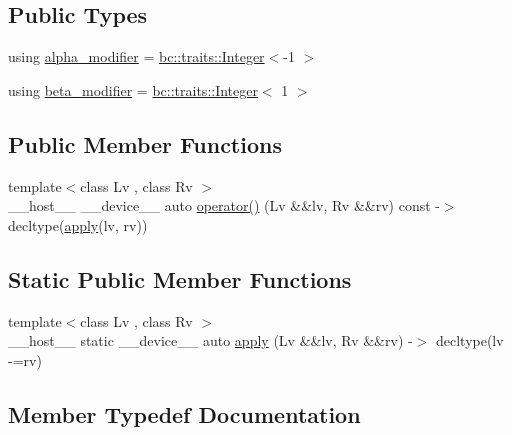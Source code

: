 \subsection*{Public Types}
\begin{DoxyCompactItemize}
\item 
using \hyperlink{structbc_1_1oper_1_1Sub__Assign_a7fc93564b8729fb040da5b04b4a010c4}{alpha\+\_\+modifier} = \hyperlink{structbc_1_1traits_1_1Integer}{bc\+::traits\+::\+Integer}$<$-\/1 $>$
\item 
using \hyperlink{structbc_1_1oper_1_1Sub__Assign_a128370b03a4a09e7a80dc8ccae9ad8de}{beta\+\_\+modifier} = \hyperlink{structbc_1_1traits_1_1Integer}{bc\+::traits\+::\+Integer}$<$ 1 $>$
\end{DoxyCompactItemize}
\subsection*{Public Member Functions}
\begin{DoxyCompactItemize}
\item 
{\footnotesize template$<$class Lv , class Rv $>$ }\\\+\_\+\+\_\+host\+\_\+\+\_\+ \+\_\+\+\_\+device\+\_\+\+\_\+ auto \hyperlink{structbc_1_1oper_1_1Sub__Assign_a46d7761920a5b9850e4e04278f1d833c}{operator()} (Lv \&\&lv, Rv \&\&rv) const -\/$>$ decltype(\hyperlink{structbc_1_1oper_1_1Sub__Assign_ab2173e9d8672bce4eb744d57092c6f1c}{apply}(lv, rv))
\end{DoxyCompactItemize}
\subsection*{Static Public Member Functions}
\begin{DoxyCompactItemize}
\item 
{\footnotesize template$<$class Lv , class Rv $>$ }\\\+\_\+\+\_\+host\+\_\+\+\_\+ static \+\_\+\+\_\+device\+\_\+\+\_\+ auto \hyperlink{structbc_1_1oper_1_1Sub__Assign_ab2173e9d8672bce4eb744d57092c6f1c}{apply} (Lv \&\&lv, Rv \&\&rv) -\/$>$ decltype(lv -\/=rv)
\end{DoxyCompactItemize}


\subsection{Member Typedef Documentation}
\mbox{\label{structbc_1_1oper_1_1Sub__Assign_a7fc93564b8729fb040da5b04b4a010c4}} 
